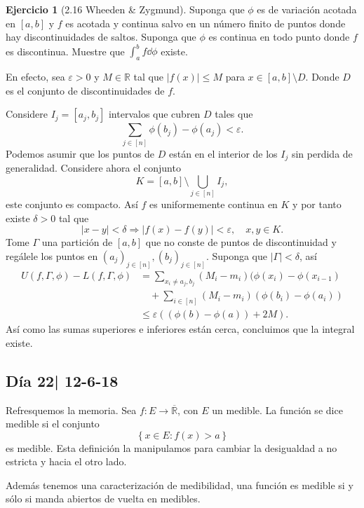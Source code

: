 \documentclass[12pt]{article}
\theoremstyle{plain}
\theoremstyle{definition}
\newtheorem{Ej}[Th]{Ejercicio}
\theoremstyle{remark}
\numberwithin{equation}{section}
\newcommand{\bR}{\mathbb{R}}        %
\renewcommand{\leq}{\leqslant}      %
\renewcommand{\:}{\colon}           %
\newcommand{\conj}[1]{\left\lbrace#1\right\rbrace}
\newcommand{\bonj}[1]{\left\lbrack#1\right\rbrack}
\begin{document}
\begin{multicols}{2}
\begin{Ej}[2.16  Wheeden \& Zygmund]
  Suponga que $\phi$ es de variación acotada en $\bonj{a,b}$ y $f$ es acotada y continua salvo en un número finito de puntos donde hay discontinuidades de saltos. Suponga que $\phi$ es continua en todo punto donde $f$ es discontinua. Muestre que $\int_{a}^{b}f\dd\phi$ existe.
\end{Ej}

\begin{ptcbp}
En efecto, sea $\varepsilon>0$ y $M\in\bR$ tal que $|f(x)|\leq M$ para $x\in\bonj{a,b}\setminus D$. Donde $D$ es el conjunto de discontinuidades de $f$.\par
Considere $I_j=\bonj{a_j,b_j}$ intervalos que cubren $D$ tales que
$$\sum_{j\in\bonj{n}}\phi(b_j)-\phi(a_j)<\varepsilon.$$
Podemos asumir que los puntos de $D$ están en el interior de los $I_j$ sin perdida de generalidad. Considere ahora el conjunto
$$K=\bonj{a,b}\setminus\bigcup_{j\in\bonj{n}}I_j,$$
este conjunto es compacto. Así $f$ es uniformemente continua en $K $ y por tanto existe $\delta>0$ tal que
$$|x-y|<\delta\Rightarrow|f(x)-f(y)|<\varepsilon,\quad x,y\in K.$$
Tome $\Gamma$ una partición de $\bonj{a,b}$ que no conste de puntos de discontinuidad y regálele los puntos en $(a_j)_{j\in\bonj{n}},(b_j)_{j\in\bonj{n}}$. Suponga que $|\Gamma|<\delta$, así
\begin{align*}
  U(f,\Gamma,\phi)-L(f,\Gamma,\phi) &=\sum_{x_i\neq a_j,b_j}(M_i-m_i)(\phi(x_i)-\phi(x_{i-1})\\
  &\quad+\sum_{i\in\bonj{n}}(M_i-m_i)(\phi(b_i)-\phi(a_i))\\
  &\leq\varepsilon((\phi(b)-\phi(a))+2M).
\end{align*}
Así como las sumas superiores e inferiores están cerca, concluimos que la integral existe.
\end{ptcbp}

\subsection{Día 22| 12-6-18}

Refresquemos la memoria. Sea $f\: E\to\overline{\bR}$, con $E$ un medible. La función se dice medible si el conjunto
$$\conj{x\in E\: f(x)>a}$$
es medible. Esta definición la manipulamos para cambiar la desigualdad a no estricta y hacia el otro lado.\par
Además tenemos una caracterización de medibilidad, una función es medible si y sólo si manda abiertos de vuelta en medibles.


\end{multicols}
\end{document}
